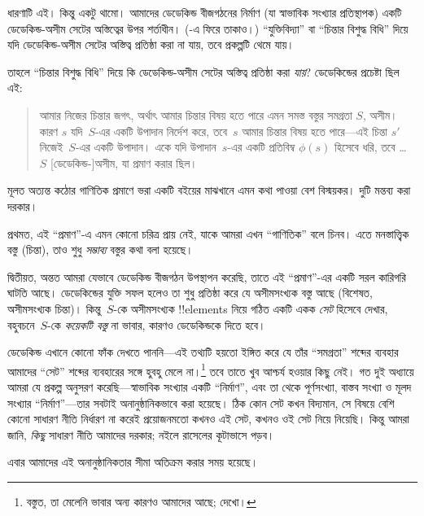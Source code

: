 \documentclass[../../../include/open-logic-section]{subfiles}
\begin{document}
ধারণাটি এই। কিন্তু একটু থামো। আমাদের ডেডেকিন্ড বীজগঠনের নির্মাণ (যা স্বাভাবিক সংখ্যার প্রতিস্থাপক) একটি ডেডেকিন্ড-অসীম সেটের অস্তিত্বের উপর শর্তাধীন। (-এ ফিরে তাকাও।) ``যুক্তিবিদ্যা'' বা ``চিন্তার বিশুদ্ধ বিধি'' দিয়ে যদি ডেডেকিন্ড-অসীম সেটের অস্তিত্ব প্রতিষ্ঠা করা না যায়, তবে প্রকল্পটি থেমে যায়।

তাহলে ``চিন্তার বিশুদ্ধ বিধি'' দিয়ে কি ডেডেকিন্ড-অসীম সেটের অস্তিত্ব প্রতিষ্ঠা করা \emph{যায়}? ডেডেকিন্ডের প্রচেষ্টা ছিল এই:
\begin{quote}
  আমার নিজের চিন্তার জগৎ, অর্থাৎ আমার চিন্তার বিষয় হতে পারে এমন সমস্ত বস্তুর সমগ্রতা $S$, অসীম। কারণ $s$ যদি~$S$-এর একটি উপাদান নির্দেশ করে, তবে~$s$ আমার চিন্তার বিষয় হতে পারে—এই চিন্তা $s'$ নিজেই~$S$-এর একটি উপাদান। একে যদি উপাদান~$s$-এর একটি প্রতিবিম্ব $\phi(s)$ হিসেবে ধরি, তবে \dots~$S$ [ডেডেকিন্ড-]অসীম, যা প্রমাণ করার ছিল।
	\citep[\S66]{Dedekind1888}
\end{quote}
মূলত অত্যন্ত কঠোর গাণিতিক প্রমাণে ভরা একটি বইয়ের মাঝখানে এমন কথা পাওয়া বেশ বিস্ময়কর। দুটি মন্তব্য করা দরকার।

প্রথমত, এই ``প্রমাণ''-এ এমন কোনো চরিত্র প্রায় নেই, যাকে আমরা এখন ``গাণিতিক'' বলে চিনব। এতে মনস্তাত্ত্বিক বস্তু (চিন্তা), তাও শুধু \emph{সম্ভাব্য} বস্তুর কথা বলা হয়েছে।

দ্বিতীয়ত, অন্তত আমরা যেভাবে ডেডেকিন্ড বীজগঠন উপস্থাপন করেছি, তাতে এই ``প্রমাণ''-এর একটি সরল কারিগরি ঘাটতি আছে। ডেডেকিন্ডের যুক্তি সফল হলেও তা শুধু প্রতিষ্ঠা করে যে অসীমসংখ্যক বস্তু আছে (বিশেষত, অসীমসংখ্যক চিন্তা)। কিন্তু~$S$-কে অসীমসংখ্যক !!{element}s নিয়ে গঠিত একটি একক \emph{সেট} হিসেবে দেখার, বহুবচনে~$S$-কে \emph{কয়েকটি বস্তু} না ভাবার, কারণও ডেডেকিন্ডকে দিতে হবে।

ডেডেকিন্ড এখানে কোনো ফাঁক দেখতে পাননি—এই তথ্যটি হয়তো ইঙ্গিত করে যে তাঁর ``সমগ্রতা'' শব্দের ব্যবহার আমাদের ``সেট'' শব্দের ব্যবহারের সঙ্গে হুবহু মেলে না।\footnote{বস্তুত, তা মেলেনি ভাবার অন্য কারণও আমাদের আছে; \citet[p.~23]{Potter2004} দেখো।} তবে তাতে খুব আশ্চর্য হওয়ার কিছু নেই। গত দুই অধ্যায়ে আমরা যে প্রকল্প অনুসরণ করেছি—স্বাভাবিক সংখ্যার একটি ``নির্মাণ'', এবং তা থেকে পূর্ণসংখ্যা, বাস্তব সংখ্যা ও মূলদ সংখ্যার ``নির্মাণ''—তার সবটাই অনানুষ্ঠানিকভাবে করা হয়েছে। ঠিক কোন সেট কখন বিদ্যমান, সে বিষয়ে বেশি কোনো সাধারণ নীতি নির্ধারণ না করেই প্রয়োজনমতো কখনও এই সেট, কখনও ওই সেট নিয়ে নিয়েছি। কিন্তু আমরা জানি, \emph{কিছু} সাধারণ নীতি আমাদের দরকার; নইলে রাসেলের কূটাভাসে পড়ব।

এবার আমাদের এই অনানুষ্ঠানিকতার সীমা অতিক্রম করার সময় হয়েছে।
\end{document}

